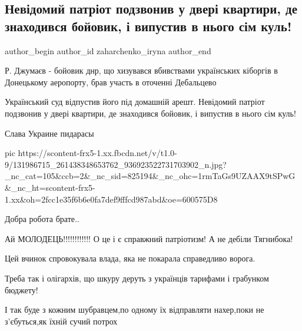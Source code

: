  
 
 
 
 
 
\subsection{Невідомий патріот подзвонив у двері квартири, де знаходився бойовик, і випустив в нього сім куль!}
\label{sec:19_12_2020.fb.zaharchenko_iryna.1.smert_bojovyk}
\ifcmt
	author_begin
   author_id zaharchenko_iryna
	author_end
\fi

Р. Джумаєв - бойовик днр, що хизувався вбивствами українських кіборгів в Донецькому аеропорту, брав участь в оточенні Дебальцево 

Український суд відпустив його під домашній арешт. Невідомий патріот подзвонив
у двері квартири, де знаходився бойовик, і випустив в нього сім куль!

Слава Украине пидарасы

\ifcmt
pic https://scontent-frx5-1.xx.fbcdn.net/v/t1.0-9/131986715_261438348653762_936923522731703902_n.jpg?_nc_cat=105&ccb=2&_nc_sid=825194&_nc_ohc=1rmTaGs9UZAAX9tSPwG&_nc_ht=scontent-frx5-1.xx&oh=2fcc1e35f6b6e0fa7def9fffcd987abd&oe=600575D8
\fi

\begin{itemize}
Добра робота брате..


Ай МОЛОДЕЦЬ!!!!!!!!!!!! О це і є справжний патріотизм! А не дебіли Тягнибока!


Цей вчинок спровокувала влада, яка не покарала справедливо ворога.


Треба так і олігархів, що шкуру деруть з українців тарифами і грабунком бюджету!


І так буде з кожним шубравцем,по одному їх відправляти нахер,поки не
з'єбуться,як їхній сучий потрох 
\end{itemize}
